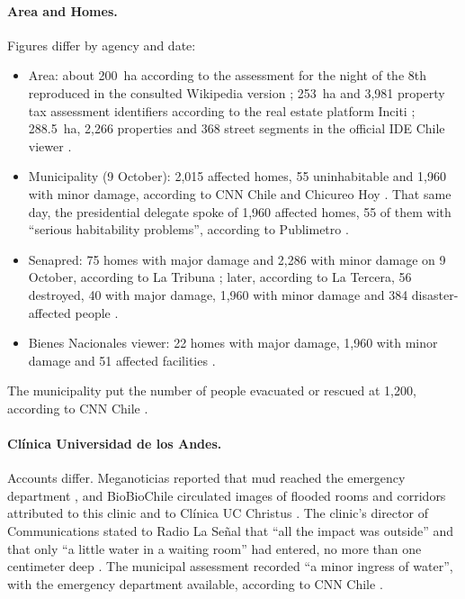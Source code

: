 \paragraph{Area and Homes.} Figures differ by agency and date:
\begin{itemize}
\item Area: about \SI{200}{ha} according to the assessment for the night of the 8th reproduced in the consulted Wikipedia version \citep{wikipedia2026}; \SI{253}{ha} and 3,981 property tax assessment identifiers according to the real estate platform Inciti \citep{chicureohoy2026}; \SI{288.5}{ha}, 2,266 properties and 368 street segments in the official IDE Chile viewer \citep{bbnn2026visor}.
\item Municipality (9 October): 2,015 affected homes, 55 uninhabitable and 1,960 with minor damage, according to CNN Chile and Chicureo Hoy \citep{cnnchile2026balance,chicureohoy2026}. That same day, the presidential delegate spoke of 1,960 affected homes, 55 of them with ``serious habitability problems'', according to Publimetro \citep{publimetro2026}.
\item Senapred: 75 homes with major damage and 2,286 with minor damage on 9 October, according to La Tribuna \citep{latribuna2026}; later, according to La Tercera, 56 destroyed, 40 with major damage, 1,960 with minor damage and 384 disaster-affected people \citep{latercera2026senapred}.
\item Bienes Nacionales viewer: 22 homes with major damage, 1,960 with minor damage and 51 affected facilities \citep{bbnn2026visor}.
\end{itemize}
The municipality put the number of people evacuated or rescued at 1,200, according to CNN Chile \citep{cnnchile2026balance}.

\paragraph{Clínica Universidad de los Andes.} Accounts differ. Meganoticias reported that mud reached the emergency department \citep{meganoticias2026urgencia}, and BioBioChile circulated images of flooded rooms and corridors attributed to this clinic and to Clínica UC Christus \citep{biobio2026clinicas}. The clinic's director of Communications stated to Radio La Señal that ``all the impact was outside'' and that only ``a little water in a waiting room'' had entered, no more than one centimeter deep \citep{radiolasenal2026}. The municipal assessment recorded ``a minor ingress of water'', with the emergency department available, according to CNN Chile \citep{cnnchile2026balance}.

